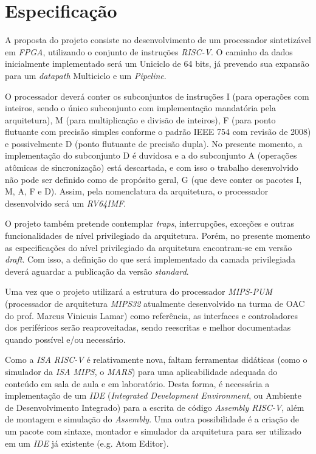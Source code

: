 \chapter{Especificação}

\label{CapSpecs}


    {A proposta do projeto consiste no desenvolvimento de um processador sintetizável em \textit{FPGA}, utilizando o conjunto de instruções \textit{RISC-V}. O caminho da dados inicialmente implementado será um Uniciclo de 64 bits, já prevendo sua expansão para um \textit{datapath} Multiciclo e um \textit{Pipeline}.}

    {O processador deverá conter os subconjuntos de instruções I (para operações com inteiros, sendo o único subconjunto com implementação mandatória pela arquitetura), M (para multiplicação e divisão de inteiros), F (para ponto flutuante com precisão simples conforme o padrão IEEE 754 com revisão de 2008) e possivelmente D (ponto flutuante de precisão dupla). No presente momento, a implementação do subconjunto D é duvidosa e a do subconjunto A (operações atômicas de sincronização) está descartada, e com isso o trabalho desenvolvido não pode ser definido como de propósito geral, G (que deve conter os pacotes I, M, A, F e D). Assim, pela nomenclatura da arquitetura, o processador desenvolvido será um \textit{RV64IMF}.}

    {O projeto também pretende contemplar \textit{traps}, interrupções, exceções e outras funcionalidades de nível privilegiado da arquitetura. Porém, no presente momento as especificações do nível privilegiado da arquitetura encontram-se em versão \textit{draft}. Com isso, a definição do que será implementado da camada privilegiada deverá aguardar a publicação da versão \textit{standard}.}

    {Uma vez que o projeto utilizará a estrutura do processador \textit{MIPS-PUM} (processador de arquitetura \textit{MIPS32} atualmente desenvolvido na turma de OAC do prof. Marcus Vinicuis Lamar) como referência, as interfaces e controladores dos periféricos serão reaproveitadas, sendo reescritas e melhor documentadas quando possível e/ou necessário.}

    {Como a \textit{ISA RISC-V} é relativamente nova, faltam ferramentas didáticas (como o simulador da \textit{ISA MIPS}, o \textit{MARS}) para uma aplicabilidade adequada do conteúdo em sala de aula e em laboratório. Desta forma, é necessária a implementação de um \textit{IDE} (\textit{Integrated Development Environment}, ou Ambiente de Desenvolvimento Integrado) para a escrita de código \textit{Assembly RISC-V}, além de montagem e simulação do \textit{Assembly}. Uma outra possibilidade é a criação de um pacote com sintaxe, montador e simulador da arquitetura para ser utilizado em um \textit{IDE} já existente (e.g. Atom Editor).}
